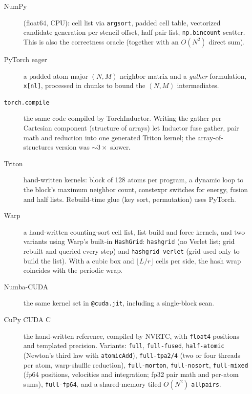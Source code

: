 \documentclass[11pt]{article}
\begin{document}
\begin{description}
\item[NumPy] (float64, CPU): cell list via \texttt{argsort}, padded cell table, vectorized
  candidate generation per stencil offset, half pair list, \texttt{np.bincount} scatter. This is
  also the correctness oracle (together with an $O(N^2)$ direct sum).
\item[PyTorch eager] a padded atom-major $(N,M)$ neighbor matrix and a \emph{gather}
  formulation, \texttt{x[nl]}, processed in chunks to bound the $(N,M)$ intermediates.
\item[\texttt{torch.compile}] the same code compiled by TorchInductor. Writing the gather per
  Cartesian component (structure of arrays) let Inductor fuse gather, pair math and reduction
  into one generated Triton kernel; the array-of-structures version was ${\sim}3\times$ slower.
\item[Triton] hand-written kernels: block of 128 atoms per program, a dynamic loop to the
  block's maximum neighbor count, constexpr switches for energy, fusion and half lists.
  Rebuild-time glue (key sort, permutation) uses PyTorch.
\item[Warp] a hand-written counting-sort cell list, list build and force kernels, and two
  variants using Warp's built-in \texttt{HashGrid}: \texttt{hashgrid} (no Verlet list; grid
  rebuilt and queried every step) and \texttt{hashgrid-verlet} (grid used only to build the
  list). With a cubic box and $\lfloor L/r\rfloor$ cells per side, the hash wrap coincides with
  the periodic wrap.
\item[Numba-CUDA] the same kernel set in \texttt{@cuda.jit}, including a single-block scan.
\item[CuPy CUDA C] the hand-written reference, compiled by NVRTC, with \texttt{float4}
  positions and templated precision. Variants: \texttt{full}, \texttt{full-fused},
  \texttt{half-atomic} (Newton's third law with \texttt{atomicAdd}), \texttt{full-tpa2/4}
  (two or four threads per atom, warp-shuffle reduction), \texttt{full-morton},
  \texttt{full-nosort}, \texttt{full-mixed} (fp64 positions, velocities and integration; fp32 pair math and per-atom sums),
  \texttt{full-fp64}, and a shared-memory tiled $O(N^2)$ \texttt{allpairs}.
\end{description}
\end{document}
